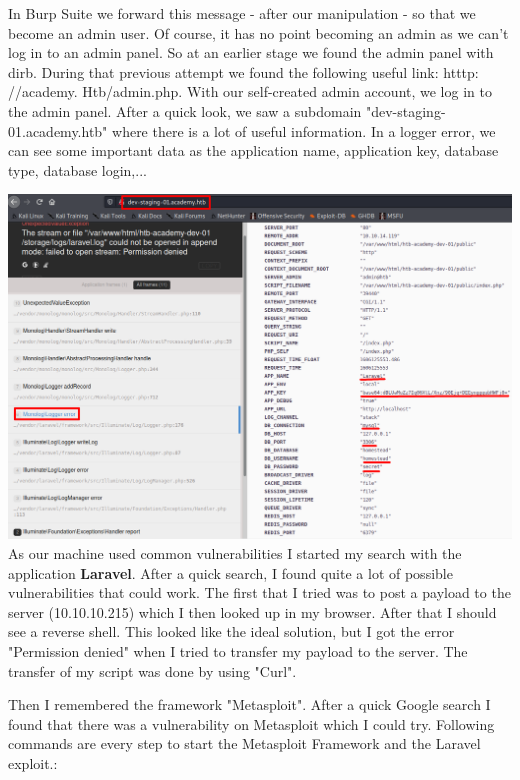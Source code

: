 \documentclass[../main.tex]{subfiles}
\begin{document}
In Burp Suite we forward this message - after our manipulation - so that we become an admin user. Of course, it has no point becoming an admin as we can't log in to an admin panel. So at an earlier stage we found the admin panel with dirb. During that previous attempt we found the following useful link: htttp: //academy. Htb/admin.php. With our self-created admin account, we log in to the admin panel. After a quick look, we saw a subdomain "dev-staging-01.academy.htb" where there is a lot of useful information. In a logger error, we can see some important data as the application name, application key, database type, database login,...

\includegraphics[width=\linewidth]{images/Robbe/Academy_http4.png}
As our machine used common vulnerabilities I started my search with the application \textbf{Laravel}. After a quick search, I found quite a lot of possible vulnerabilities that could work. The first that I tried was to post a payload to the server (10.10.10.215) which I then looked up in my browser. After that I should see a reverse shell. This looked like the ideal solution, but I got the error "Permission denied" when I tried to transfer my payload to the server. The transfer of my script was done by using "Curl".

Then I remembered the framework "Metasploit". After a quick Google search I found that there was a vulnerability on Metasploit which I could try. Following commands are every step to start the Metasploit Framework and the Laravel exploit.:
\end{document}
